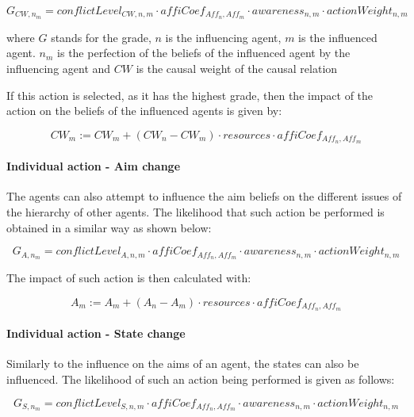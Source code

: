 \begin{equation}
G_{CW, n_m} = conflictLevel_{CW, n, m} \cdot affiCoef_{Aff_n,Aff_m} \cdot awareness_{n,m} \cdot actionWeight_{n,m}
\end{equation}

where $G$ stands for the grade, $n$ is the influencing agent, $m$ is the influenced agent. $n_m$ is the perfection of the beliefs of the influenced agent by the influencing agent and $CW$ is the causal weight of the causal relation

If this action is selected, as it has the highest grade, then the impact of the action on the beliefs of the influenced agents is given by:

\begin{equation}
CW_{m} := CW_{m} + \left(CW_{n} - CW_{m} \right) \cdot resources \cdot affiCoef_{Aff_n,Aff_m}
\end{equation}

\paragraph{Individual action - Aim change}

The agents can also attempt to influence the aim beliefs on the different issues of the hierarchy of other agents. The likelihood that such action be performed is obtained in a similar way as shown below:

\begin{equation}
G_{A, n_m} = conflictLevel_{A, n, m} \cdot affiCoef_{Aff_n,Aff_m} \cdot awareness_{n,m} \cdot actionWeight_{n,m}
\end{equation}

The impact of such action is then calculated with:

\begin{equation}
A_{m} := A_{m} + \left(A_{n} - A_{m} \right) \cdot resources \cdot affiCoef_{Aff_n,Aff_m}
\end{equation}

\paragraph{Individual action - State change}

Similarly to the influence on the aims of an agent, the states can also be influenced. The likelihood of such an action being performed is given as follows:

\begin{equation}
G_{S, n_m} = conflictLevel_{S, n,m} \cdot affiCoef_{Aff_n,Aff_m} \cdot awareness_{n,m} \cdot actionWeight_{n,m}
\end{equation}

